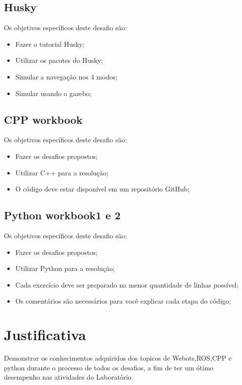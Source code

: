 \subsection{Husky}
Os objetivos específicos deste desafio são:
\begin{itemize}
      \item Fazer o tutorial Husky;
      \item Utilizar os pacotes do Husky;
      \item Simular a navegação nos 4 modos;
      \item Simular usando o gazebo;
  \end{itemize}
\subsection{CPP workbook}
Os objetivos específicos deste desafio são:
\begin{itemize}
      \item Fazer os desafios propostos;
      \item Utilizar C++ para a resolução;
      \item O código deve estar disponível em um repositório GitHub;
  \end{itemize}
  \subsection{Python workbook1 e 2}
  Os objetivos específicos deste desafio são:
  \begin{itemize}
        \item Fazer os desafios propostos;
        \item Utilizar Python para a resolução;
        \item Cada exercício deve ser preparado na menor quantidade de linhas possível;
        \item Os comentários são necessários para você explicar cada etapa do código;
    \end{itemize}
\section{Justificativa}
\label{sec:justi}

Demonstrar os conhecimentos adquiridos dos topicos de Webots,ROS,CPP e python durante o processo de todos os desafios, 
a fim de ter um ótimo desempenho nas atividades do Laboratório.

